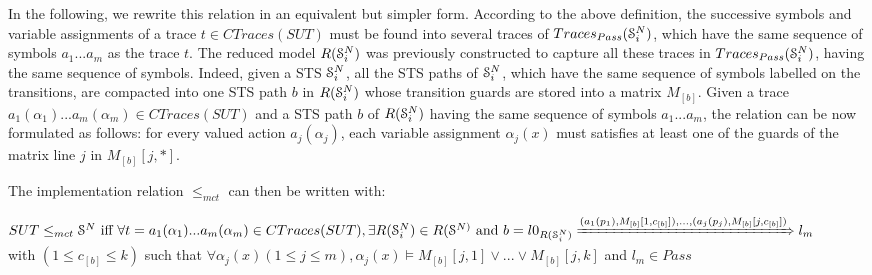 In the following, we rewrite this relation in an equivalent but
simpler form. According to the above definition, the successive
symbols and variable assignments of a trace $t \in
CTraces({SUT})$ must be found into several traces of
$Traces_{Pass}(\EuScript{S}_i^{N})$, which have the same sequence
of symbols $a_1...a_m$ as the trace $t$. The reduced model
$R(\EuScript{S}_i^{N})$ was previously constructed to capture
all these traces in $Traces_{Pass}(\EuScript{S}_i^{N})$, having
the same sequence of symbols. Indeed, given a STS
$\EuScript{S}_i^{N}$, all the STS paths of $\EuScript{S}_i^{N}$,
which have the same sequence of symbols labelled on the
transitions, are compacted into one STS path $b$ in
$R(\EuScript{S}_i^{N})$ whose transition guards are stored into a
matrix $M_{[b]}$.
Given a trace $a_1(\alpha_1)...a_m(\alpha_m) \in CTraces({SUT})$ and a STS path $b$ of $R(\EuScript{S}_i^{N})$ having the same sequence of symbols $a_1...a_m$, the relation can be now formulated as follows: for every valued action
$a_j(\alpha_j)$, each variable assignment $\alpha_j(x)$ must
satisfies at least one of the guards of the matrix line $j$ in
$M_{[b]}[j,*]$.

The implementation relation $\leq_{mct}$ can then be written with:

\begin{proposition}
	${SUT} \leq_{mct} \EuScript{S}^{N} \text{ iff } \forall t=
	a_1(\alpha_1)...a_m(\alpha_m)\\ \in CTraces({SUT}), \exists
	R(\EuScript{S}_i^{N}) \in R(\EuScript{S}^{N)} \text{ and }
	b=l0_{R(\EuScript{S}_i^{N})}
	\\ \xRightarrow{(a_1(p_1),M_{[b]}[1,c_{[b]}]),...,(a_j(p_j),M_{[b]}[j,c_{[b]}])} l_m$\\ with $(1 \leq c_{[b]} \leq k)$ such that $\forall \alpha_j(x) (1 \leq j \leq m), \alpha_j(x) \models M_{[b]}[j,1] \vee ... \vee  M_{[b]}[j,k]$ and $l_m \in Pass$
\end{proposition}

